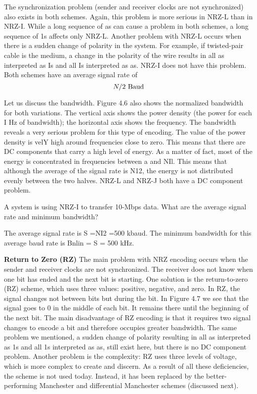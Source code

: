The synchronization problem (sender and receiver clocks are not synchronized) also exists in both schemes. Again, this problem is more serious in NRZ-L than in NRZ-I. While a long sequence of as can cause a problem in both schemes, a long sequence of 1s affects only NRZ-L. Another problem with NRZ-L occurs when there is a sudden change of polarity in the system. For example, if twisted-pair cable is the medium, a change in the polarity of the wire results in all as interpreted as Is and all Is interpreted as as. NRZ-I does not have this problem. Both schemes have an average signal rate of
\begin{equation*}
  N/2 \textnormal{ Baud}
\end{equation*}

Let us discuss the bandwidth. Figure 4.6 also shows the normalized bandwidth for both variations. The vertical axis shows the power density (the power for each I Hz of bandwidth); the horizontal axis shows the frequency. The bandwidth reveals a very serious problem for this type of encoding. The value of the power density is velY high around frequencies close to zero. This means that there are DC components that carry a high level of energy. As a matter of fact, most of the energy is concentrated in frequencies between a and NIl. This means that although the average of the signal rate is N12, the energy is not distributed evenly between the two halves. NRZ-L and NRZ-J both have a DC component problem.

\vspace{12pt}

\begin{example}
  A system is using NRZ-I to transfer 10-Mbps data. What are the average signal rate and minimum bandwidth?
\end{example}

\begin{solution}
  The average signal rate is S =NI2 =500 kbaud. The minimum bandwidth for this average baud rate is Bnlin = S = 500 kHz.
\end{solution}

\textbf{Return to Zero (RZ)} The main problem with NRZ encoding occurs when the sender and receiver clocks are not synchronized. The receiver does not know when one bit has ended and the next bit is starting. One solution is the return-to-zero (RZ) scheme, which uses three values: positive, negative, and zero. In RZ, the signal changes not between bits but during the bit. In Figure 4.7 we see that the signal goes to 0 in the middle of each bit. It remains there until the beginning of the next bit. The main disadvantage of RZ encoding is that it requires two signal changes to encode a bit and therefore occupies greater bandwidth. The same problem we mentioned, a sudden change of polarity resulting in all as interpreted as 1s and all 1s interpreted as as, still exist here, but there is no DC component problem. Another problem is the complexity: RZ uses three levels of voltage, which is more complex to create and discern. As a result of all these deficiencies, the scheme is not used today. Instead, it has been replaced by the better-performing Manchester and differential Manchester schemes (discussed next).

